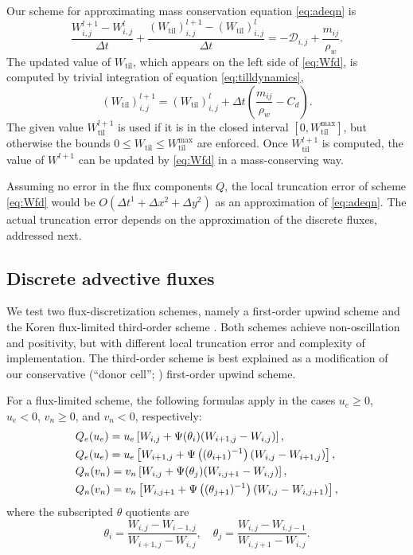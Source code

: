 \documentclass[gmd]{copernicus}   %
\newcommand{\text}{\textrm}
\newcommand{\Wtil}{W_{\text{til}}}
\newcommand{\Wtilmax}{W_{\text{til}}^{\text{max}}}
\begin{document}
Our scheme for approximating mass conservation equation \eqref{eq:adeqn} is
\begin{equation}
\frac{W_{i,j}^{l+1} - W_{i,j}^l}{\Delta t} + \frac{(\Wtil)_{i,j}^{l+1} - (\Wtil)_{i,j}^l}{\Delta t} = - \mathcal{D}_{i,j} + \frac{m_{ij}}{\rho_w}.    \label{eq:Wfd}
\end{equation}
The updated value of $\Wtil$, which appears on the left side of \eqref{eq:Wfd}, is computed by trivial integration of equation \eqref{eq:tilldynamics},
\begin{equation}
(\Wtil)_{i,j}^{l+1} = (\Wtil)_{i,j}^l + \Delta t \left(\frac{m_{ij}}{\rho_w} - C_d\right).  \label{eq:tillupdatefd}
\end{equation}
The given value $\Wtil^{l+1}$ is used if it is in the closed interval $[0,\Wtilmax]$, but otherwise the bounds $0\le \Wtil \le \Wtilmax$ are enforced.  Once $\Wtil^{l+1}$ is computed, the value of $W^{l+1}$ can be updated by \eqref{eq:Wfd} in a mass-conserving way.

Assuming no error in the flux components $Q$, the local truncation error \citep{MortonMayers} of scheme \eqref{eq:Wfd} would be $O(\Delta t^1 + \Delta x^2 + \Delta y^2)$ as an approximation of \eqref{eq:adeqn}.  The actual truncation error depends on the approximation of the discrete fluxes, addressed next.

\subsection{Discrete advective fluxes}  \label{subsect:discretefluxes}  We test two flux-discretization schemes, namely a first-order upwind scheme and the Koren flux-limited third-order scheme \citep{HundsdorferVerwer2010}.  Both schemes achieve non-oscillation and positivity, but with different local truncation error and complexity of implementation.  The third-order scheme is best explained as a modification of our conservative (``donor cell''; \cite{LeVeque}) first-order upwind scheme.

For a flux-limited scheme, the following formulas apply in the cases $u_e \ge 0$, $u_e < 0$, $v_n \ge 0$, and $v_n < 0$, respectively:
\begin{align}
&Q_e(u_e) = u_e \left[W_{i,j} + \Psi(\theta_{i}) (W_{i+1,j} - W_{i,j})\right], \label{eq:adfluxes} \\ 
&Q_e(u_e) = u_e \left[W_{i+1,j} + \Psi\left((\theta_{i+1})^{-1}\right) (W_{i,j} - W_{i+1,j})\right],  \notag \\
&Q_n(v_n) = v_n \left[W_{i,j} + \Psi(\theta_{j}) (W_{i,j+1} - W_{i,j})\right], \notag \\
&Q_n(v_n) = v_n \left[W_{i,j+1} + \Psi\left((\theta_{j+1})^{-1}\right) (W_{i,j} - W_{i,j+1})\right],\notag
\end{align}
where the subscripted $\theta$ quotients are
\begin{equation*}
\theta_i = \frac{W_{i,j}-W_{i-1,j}}{W_{i+1,j} - W_{i,j}}, \quad \theta_j = \frac{W_{i,j}-W_{i,j-1}}{W_{i,j+1} - W_{i,j}}.
\end{equation*}
\end{document}
